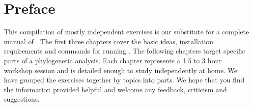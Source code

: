 \chapter{Preface}

This compilation of mostly independent exercises is our substitute for a complete manual of \RevBayes.
The first three chapters cover the basic ideas, installation requirements and commands for running \RevBayes.
The following chapters target specific parts of a phylogenetic analysis.
Each chapter represents a 1.5 to 3 hour workshop session and is detailed enough to study independently at home.
We have grouped the exercises together by topics into parts.
We hope that you find the information provided helpful and welcome any feedback, criticism and suggestions.
